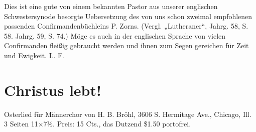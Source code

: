 Dies ist eine gute von einem bekannten Pastor aus unserer englischen Schwestersynode besorgte Uebersetzung des von uns schon zweimal empfohlenen passenden Confirmandenbüchleins P. Zorns. (Vergl. „Lutheraner“, Jahrg. 58, S. 58. Jahrg. 59, S. 74.) Möge es auch in der englischen Sprache von vielen Confirmanden fleißig gebraucht werden und ihnen zum Segen gereichen für Zeit und Ewigkeit. L. F.

\section{Christus lebt!}
Osterlied für Männerchor von H. B. Bröhl, 3606 S. Hermitage Ave., Chicago, Ill. 3 Seiten 11×7½. Preis: 15 Cts., das Dutzend \$1.50 portofrei.
